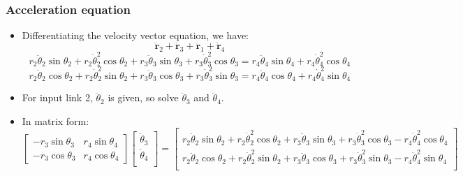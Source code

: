 \documentclass[11pt]{article}
\begin{document}
\subsubsection{Acceleration equation}
\label{sec:orgf31a9d3}
\begin{itemize}
\item Differentiating the velocity vector equation, we have:
\[\ddot{\boldsymbol{r}}_2 + \ddot{\boldsymbol{r}}_3 + \ddot{\boldsymbol{r}}_1 + \ddot{\boldsymbol{r}}_4\]
\[r_2 \ddot{\theta}_2 \sin \theta_2 + r_2 \dot{\theta}_2^2 \cos \theta_2 + r_3 \ddot{\theta}_3 \sin \theta_3 + r_3 \dot{\theta}_3^2 \cos \theta_3 = r_4 \ddot{\theta}_4 \sin \theta_4 + r_4 \dot{\theta}_4^2 \cos \theta_4\]
\[r_2 \ddot{\theta}_2 \cos \theta_2 + r_2 \dot{\theta}_2^2 \sin \theta_2 + r_3 \ddot{\theta}_3 \cos \theta_3 + r_3 \dot{\theta}_3^2 \sin \theta_3 = r_4 \ddot{\theta}_4 \cos \theta_4 + r_4 \dot{\theta}_4^2 \sin \theta_4\]
\item For input link 2, \(\ddot{\theta}_2\) is given, so solve \(\ddot{\theta}_3\) and \(\ddot{\theta}_4\).
\item In matrix form:
\begin{displaymath}
\begin{bmatrix}
-r_3 \sin \theta_3 & r_4 \sin \theta_4 \\
-r_3 \cos \theta_3 & r_4 \cos \theta_4
\end{bmatrix}
\begin{bmatrix}
\ddot{\theta}_3 \\
\ddot{\theta}_4 \\
\end{bmatrix} = \begin{bmatrix}
r_2 \ddot{\theta}_2 \sin \theta_2 + r_2 \dot{\theta}_2^2 \cos \theta_2 + r_3 \ddot{\theta}_3 \sin \theta_3 + r_3 \dot{\theta}_3^2 \cos \theta_3 - r_4 \dot{\theta}_4^2 \cos \theta_4 \\
r_2 \ddot{\theta}_2 \cos \theta_2 + r_2 \dot{\theta}_2^2 \sin \theta_2 + r_3 \ddot{\theta}_3 \cos \theta_3 + r_3 \dot{\theta}_3^2 \sin \theta_3 - r_4 \dot{\theta}_4^2 \sin \theta_4 \\
\end{bmatrix}
\end{displaymath}
\end{itemize}
\end{document}
